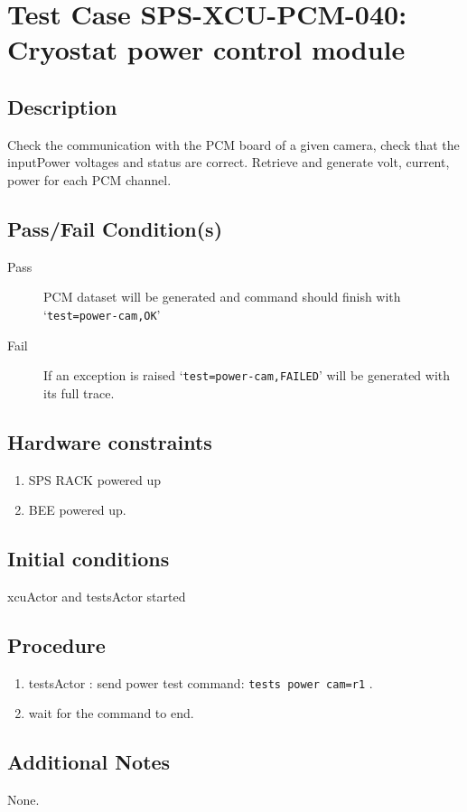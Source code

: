 \section{Test Case SPS-XCU-PCM-040: Cryostat power control module}

\subsection{Description}

Check the communication with the PCM board of a given camera, check that the inputPower voltages and status are correct.
Retrieve and generate volt, current, power for each PCM channel.

\subsection{Pass/Fail Condition(s)}

\begin{description}
\item [Pass] PCM dataset will be generated and command should finish with `\texttt{test=power-cam,OK}'
\item [Fail] If an exception is raised `\texttt{test=power-cam,FAILED}' will be generated with its full trace.

\end{description}

\subsection{Hardware constraints}

\begin{enumerate}
    \item SPS RACK powered up
    \item BEE powered up.
\end{enumerate}

\subsection{Initial conditions}

xcuActor and testsActor started

\subsection{Procedure}

\begin{enumerate}
    \item testsActor : send power test command: \texttt{tests power cam=r1} .
    \item wait for the command to end.
\end{enumerate}

\subsection{Additional Notes}
None.
